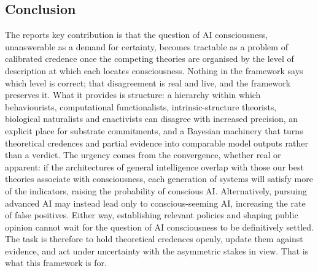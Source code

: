 \documentclass[11pt, a4paper, onecolumn, gdm]{google}
\begin{document}
\subsection{Conclusion}\label{conclusion-1}

The report\textquotesingle s key contribution is that the question of AI consciousness, unanswerable as a demand for certainty, becomes tractable as a problem of calibrated credence once the competing theories are organised by the level of description at which each locates consciousness.
Nothing in the framework says which level is correct; that disagreement is real and live, and the framework preserves it.
What it provides is structure: a hierarchy within which behaviourists, computational functionalists, intrinsic-structure theorists, biological naturalists and enactivists can disagree with increased precision, an explicit place for substrate commitments, and a Bayesian machinery that turns theoretical credences and partial evidence into comparable model outputs rather than a verdict.
The urgency comes from the convergence, whether real or apparent: if the architectures of general intelligence overlap with those our best theories associate with consciousness, each generation of systems will satisfy more of the indicators, raising the probability of conscious AI. Alternatively, pursuing advanced AI may instead lead only to conscious-seeming AI, increasing the rate of false positives. Either way, establishing relevant policies and shaping public opinion cannot wait for the question of AI consciousness to be definitively settled.
The task is therefore to hold theoretical credences openly, update them against evidence, and act under uncertainty with the asymmetric stakes in view.
That is what this framework is for.
\end{document}
